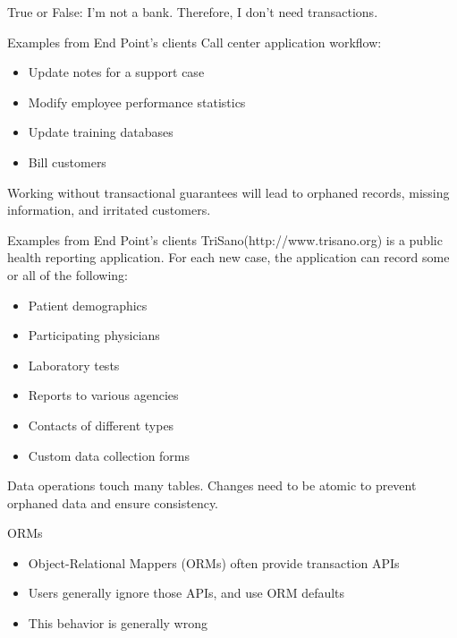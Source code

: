 \documentclass[svgnames]{beamer}
\begin{document}
\begin{frame}
    True or False: I'm not a bank. Therefore, I don't need transactions.
\end{frame}

\begin{frame}{Examples from End Point's clients}
    Call center application workflow:
    \vspace{10pt}
    \begin{itemize}
        \item Update notes for a support case
        \item Modify employee performance statistics
        \item Update training databases
        \item Bill customers
    \end{itemize}
    \vspace{10pt}
    Working without transactional guarantees will lead to orphaned records,
    missing information, and irritated customers.
\end{frame}

\begin{frame}{Examples from End Point's clients}
    TriSano\texttrademark  (http://www.trisano.org) is a public health
    reporting application. For each new case, the application can record some
    or all of the following:
    \begin{itemize}
        \item Patient demographics
        \item Participating physicians
        \item Laboratory tests
        \item Reports to various agencies
        \item Contacts of different types
        \item Custom data collection forms
    \end{itemize}
    Data operations touch many tables. Changes need to be atomic to
    prevent orphaned data and ensure consistency.
\end{frame}

\begin{frame}{ORMs}
    \begin{itemize}
        \item Object-Relational Mappers (ORMs) often provide transaction APIs
        \item Users generally ignore those APIs, and use ORM defaults
        \item This behavior is generally wrong
    \end{itemize}
\end{frame}
\end{document}
